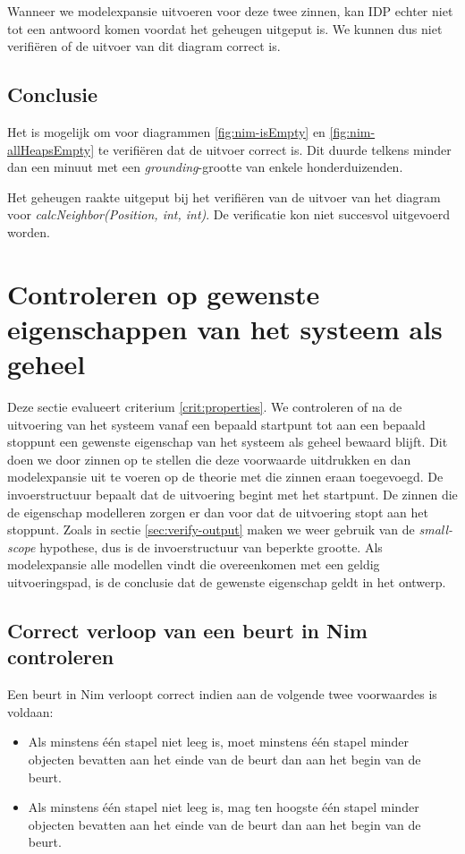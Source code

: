Wanneer we modelexpansie uitvoeren voor deze twee zinnen, kan IDP echter niet tot een antwoord komen voordat het geheugen uitgeput is. We kunnen dus niet verifi\"eren of de uitvoer van dit diagram correct is.

\subsection{Conclusie}

Het is mogelijk om voor diagrammen \ref{fig:nim-isEmpty} en \ref{fig:nim-allHeapsEmpty} te verifi\"eren dat de uitvoer correct is. Dit duurde telkens minder dan een minuut met een \textit{grounding}-grootte van enkele honderduizenden.

Het geheugen raakte uitgeput bij het verifi\"eren van de uitvoer van het diagram voor \textit{calcNeighbor(Position, int, int)}. De verificatie kon niet succesvol uitgevoerd worden.

\section{Controleren op gewenste eigenschappen van het systeem als geheel}

Deze sectie evalueert criterium \ref{crit:properties}. We controleren of na de uitvoering van het systeem vanaf een bepaald startpunt tot aan een bepaald stoppunt een gewenste eigenschap van het systeem als geheel bewaard blijft. Dit doen we door zinnen op te stellen die deze voorwaarde uitdrukken en dan modelexpansie uit te voeren op de theorie met die zinnen eraan toegevoegd. De invoerstructuur bepaalt dat de uitvoering begint met het startpunt. De zinnen die de eigenschap modelleren zorgen er dan voor dat de uitvoering stopt aan het stoppunt. Zoals in sectie \ref{sec:verify-output} maken we weer gebruik van de \textit{small-scope} hypothese, dus is de invoerstructuur van beperkte grootte. Als modelexpansie alle modellen vindt die overeenkomen met een geldig uitvoeringspad, is de conclusie dat de gewenste eigenschap geldt in het ontwerp.

\subsection{Correct verloop van een beurt in Nim controleren}

Een beurt in Nim verloopt correct indien aan de volgende twee voorwaardes is voldaan:

\begin{itemize}
	\item Als minstens \'e\'en stapel niet leeg is, moet minstens \'e\'en stapel minder objecten bevatten aan het einde van de beurt dan aan het begin van de beurt.
	\item Als minstens \'e\'en stapel niet leeg is, mag ten hoogste \'e\'en stapel minder objecten bevatten aan het einde van de beurt dan aan het begin van de beurt.
\end{itemize}


